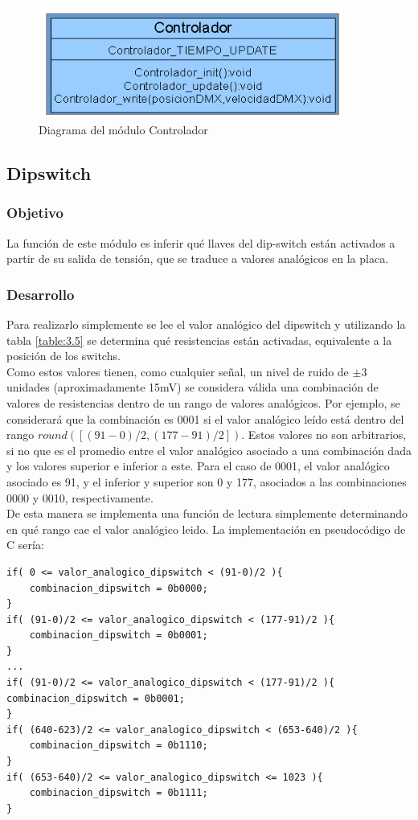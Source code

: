 \begin{figure}[!ht]
	\centering
	\includegraphics[width=10cm,scale=1]{resources/3_27-moduloControlador.png}
	\caption{Diagrama del módulo Controlador}
	\label{fig:\thefigure}
\end{figure}

\subsection{Dipswitch}
\subsubsection{Objetivo}
La función de este módulo es inferir qué llaves del dip-switch están activados a partir de su salida de tensión, que se traduce a valores analógicos en la placa. 

\subsubsection{Desarrollo}
Para realizarlo simplemente se lee el valor analógico del dipswitch y utilizando la tabla \ref{table:3.5} se determina qué resistencias están activadas, equivalente a la posición de los switchs. \\
Como estos valores tienen, como cualquier señal, un nivel de ruido de \(\pm\)3 unidades (aproximadamente 15mV) se considera válida una combinación de valores de resistencias dentro de un rango de valores analógicos. Por ejemplo, se considerará que la combinación es 0001 si el valor analógico leído está dentro del rango \(round([(91-0)/2,(177-91)/2])\). Estos valores no son arbitrarios, si no que es el promedio entre el valor analógico asociado a una combinación dada y los valores superior e inferior a este. Para el caso de 0001, el valor analógico asociado es 91, y el inferior y superior son 0 y 177, asociados a las combinaciones 0000 y 0010, respectivamente.\\
De esta manera se implementa una función de lectura simplemente determinando en qué rango cae el valor analógico leido. La implementación en pseudocódigo de C sería:
\begin{lstlisting}[style=CStyle]
if( 0 <= valor_analogico_dipswitch < (91-0)/2 ){
	combinacion_dipswitch = 0b0000;
}
if( (91-0)/2 <= valor_analogico_dipswitch < (177-91)/2 ){
	combinacion_dipswitch = 0b0001;
}
...
if( (91-0)/2 <= valor_analogico_dipswitch < (177-91)/2 ){
combinacion_dipswitch = 0b0001;
}
if( (640-623)/2 <= valor_analogico_dipswitch < (653-640)/2 ){
	combinacion_dipswitch = 0b1110;
}
if( (653-640)/2 <= valor_analogico_dipswitch <= 1023 ){
	combinacion_dipswitch = 0b1111;
}
\end{lstlisting}

